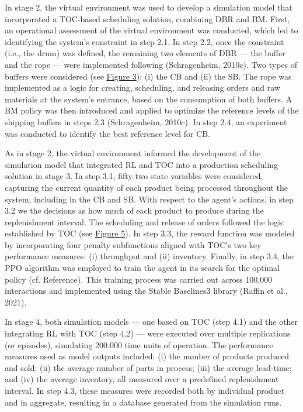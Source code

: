 In stage 2, the virtual environment was used to develop a simulation
model that incorporated a TOC-based scheduling solution, combining DBR
and BM. First, an operational assessment of the virtual environment was
conducted, which led to identifying the system's constraint in step 2.1.
In step 2.2, once the constraint (i.e., the drum) was defined, the
remaining two elements of DBR --- the buffer and the rope --- were
implemented following (Schragenheim, 2010c). Two types of buffers were
considered (see \colorbox{yellow!40}{\hyperref[_Ref187516903]{Figure 3}}): (i) the CB and
(ii) the SB. The rope was implemented as a logic for creating,
scheduling, and releasing orders and raw materials at the system's
entrance, based on the consumption of both buffers. A BM policy was then
introduced and applied to optimize the reference levels of the shipping
buffers in steps 2.3 (Schragenheim, 2010c). In step 2.4, an experiment
was conducted to identify the best reference level for CB.

As in stage 2, the virtual environment informed the development of the
simulation model that integrated RL and TOC into a production scheduling
solution in stage 3. In step 3.1, fifty-two state variables were
considered, capturing the current quantity of each product being
processed throughout the system, including in the CB and SB. With
respect to the agent's actions, in step 3.2 we the decisions as how much
of each product to produce during the replenishment interval. The
scheduling and release of orders followed the logic established by TOC
(see \colorbox{yellow!40}{\hyperref[_Ref187516938]{Figure 5}}). In step 3.3, the reward
function was modeled by incorporating four penalty subfunctions aligned
with TOC's two key performance measures: (i) throughput and (ii)
inventory. Finally, in step 3.4, the PPO algorithm was employed to train
the agent in its search for the optimal policy (\colorbox{yellow!40}{cf. Reference}).
This training process was carried out across 100,000 interactions and
implemented using the Stable Baselines3 library (\colorbox{yellow!40}{Raffin et al.,
2021}).

In stage 4, both simulation models --- one based on TOC (step 4.1) and
the other integrating RL with TOC (step 4.2) --- were executed over
multiple replications (or episodes), simulating 200.000 time units of
operation. The performance measures used as model outputs included: (i)
the number of products produced and sold; (ii) the average number of
parts in process; (iii) the average lead-time; and (iv) the average
inventory, all measured over a predefined replenishment interval. In
step 4.3, these measures were recorded both by individual product and in
aggregate, resulting in a database generated from the simulation runs.

